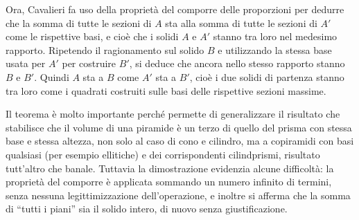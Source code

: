 \par Ora, Cavalieri fa uso della propriet\`a del comporre delle proporzioni per dedurre che la somma di tutte le sezioni di $A$ sta alla somma di tutte le sezioni di $A'$ come le rispettive basi, e cio\`e che i solidi $A$ e $A'$ stanno tra loro nel medesimo rapporto. Ripetendo il ragionamento sul solido $B$ e utilizzando la stessa base usata per $A'$ per costruire $B'$, si deduce che ancora nello stesso rapporto stanno $B$ e $B'$. Quindi $A$ sta a $B$ come $A'$ sta a $B'$, cio\`e i due solidi di partenza stanno tra loro come i quadrati costruiti sulle basi delle rispettive sezioni massime.
\par Il teorema \`e molto importante perch\'e permette di generalizzare il risultato che stabilisce che il volume di una piramide \`e un terzo di quello del prisma con stessa base e stessa altezza, non solo al caso di cono e cilindro, ma a copiramidi con basi qualsiasi (per esempio ellitiche) e dei corrispondenti cilindprismi, risultato tutt'altro che banale. Tuttavia la dimostrazione evidenzia alcune difficolt\`a: la propriet\`a del comporre \`e applicata sommando un numero infinito di termini, senza nessuna legittimizzazione dell'operazione, e inoltre si afferma che la somma di ``tutti i piani'' sia il solido intero, di nuovo senza giustificazione.
